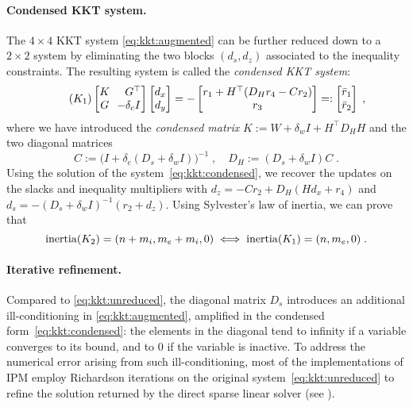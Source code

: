 \paragraph{Condensed KKT system.}
The $4 \times 4$ KKT system \eqref{eq:kkt:augmented} can be further
reduced down to a $2 \times 2$ system by eliminating the two blocks
$(d_s, d_z)$ associated to the inequality constraints.
The resulting system is called the \emph{condensed KKT system}:
\begin{equation}
  \label{eq:kkt:condensed}
  \tag{$K_1$}
  \setlength\arraycolsep{3pt}
  \begin{bmatrix}
    K & \phantom{-} G^\top \\
    G & -\delta_c I
  \end{bmatrix}
  \begin{bmatrix}
    d_x \\ d_y
  \end{bmatrix}
  =
  -
  \begin{bmatrix}
    r_1 + H^\top(D_H r_4 - C r_2) \\ r_3
  \end{bmatrix}
  =:
  \begin{bmatrix}
    \bar{r}_1 \\ \bar{r}_2
  \end{bmatrix}
   \; ,
\end{equation}
where we have introduced the \emph{condensed matrix} $K := W + \delta_w I  + H^\top D_H H$
and the two diagonal matrices
\begin{equation}
  C := \big(I + \delta_c(D_s + \delta_w I)\big)^{-1} \; , \quad
  D_H := (D_s + \delta_w I) C \; .
\end{equation}
Using the solution of the system~\eqref{eq:kkt:condensed},
we recover the updates on the slacks and inequality multipliers with
$d_z = -C r_2 + D_H(H d_x + r_4)$ and $d_s = -(D_s + \delta_w I)^{-1}(r_2 + d_z)$.
Using Sylvester's law of inertia, we can prove that
\begin{equation}
  \label{eq:ipm:inertia}
  \operatorname{inertia}(K_2) = (n+m_i, m_e+m_i, 0) \iff
  \operatorname{inertia}(K_1) = (n, m_e, 0) \;.
\end{equation}

\paragraph{Iterative refinement.}
Compared to \eqref{eq:kkt:unreduced},
the diagonal matrix $D_s$ introduces
an additional ill-conditioning in \eqref{eq:kkt:augmented}, amplified
in the condensed form~\eqref{eq:kkt:condensed}:
the elements in the diagonal tend to infinity if a variable converges to its bound,
and to $0$ if the variable is inactive.
To address the numerical error arising from such ill-conditioning, most of the
implementations of IPM employ Richardson iterations on the original system~\eqref{eq:kkt:unreduced} to refine the solution returned by the direct sparse linear solver (see \cite[Section 3.10]{wachter2006implementation}).

